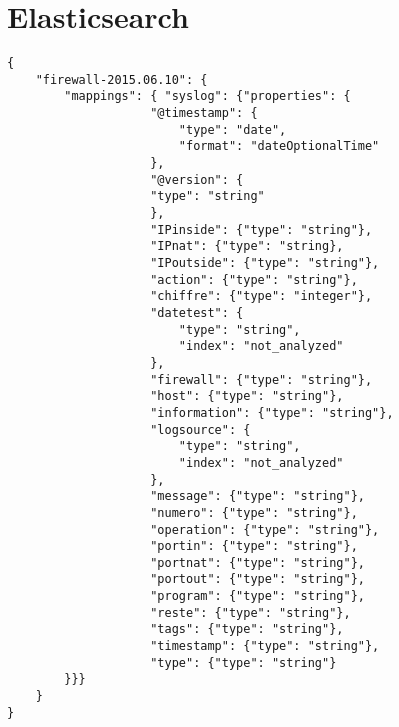 
\section{Elasticsearch}
\begin{lstlisting}[style=code,label={lst:mappingresult},caption={Exemple de mapping}]
{
    "firewall-2015.06.10": {
        "mappings": { "syslog": {"properties": {
                    "@timestamp": {
                        "type": "date",
                        "format": "dateOptionalTime"
                    },
                    "@version": {
                    "type": "string"
                    },
                    "IPinside": {"type": "string"},
                    "IPnat": {"type": "string},
                    "IPoutside": {"type": "string"},
                    "action": {"type": "string"},
                    "chiffre": {"type": "integer"},
                    "datetest": {
                        "type": "string",
                        "index": "not_analyzed"
                    },
                    "firewall": {"type": "string"},
                    "host": {"type": "string"},
                    "information": {"type": "string"},
                    "logsource": {
                        "type": "string",
                        "index": "not_analyzed"
                    },
                    "message": {"type": "string"},
                    "numero": {"type": "string"},
                    "operation": {"type": "string"},
                    "portin": {"type": "string"},
                    "portnat": {"type": "string"},
                    "portout": {"type": "string"},
                    "program": {"type": "string"},
                    "reste": {"type": "string"},
                    "tags": {"type": "string"},
                    "timestamp": {"type": "string"},
                    "type": {"type": "string"}
        }}}
    }
}
\end{lstlisting}
\label{lst:mappingresult}

